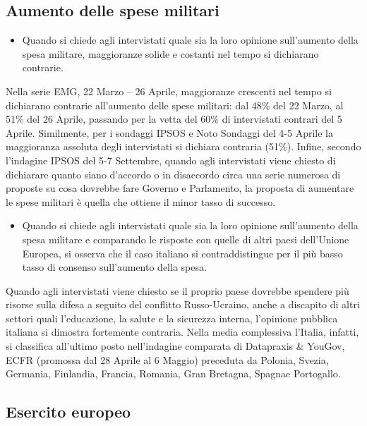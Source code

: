 \documentclass[
]{book}
\providecommand{\tightlist}{%
  \setlength{\itemsep}{0pt}\setlength{\parskip}{0pt}}
\begin{document}
\hypertarget{aumento-delle-spese-militari}{%
\subsection{Aumento delle spese militari}\label{aumento-delle-spese-militari}}

\begin{itemize}
\tightlist
\item
  Quando si chiede agli intervistati quale sia la loro opinione sull'aumento della spesa militare, maggioranze solide e costanti nel tempo si dichiarano contrarie.
\end{itemize}

Nella serie EMG, 22 Marzo -- 26 Aprile, maggioranze crescenti nel tempo si dichiarano contrarie all'aumento delle spese militari: dal 48\% del 22 Marzo, al 51\% del 26 Aprile, passando per la vetta del 60\% di intervistati contrari del 5 Aprile. Similmente, per i sondaggi IPSOS e Noto Sondaggi del 4-5 Aprile la maggioranza assoluta degli intervistati si dichiara contraria (51\%).
Infine, secondo l'indagine IPSOS del 5-7 Settembre, quando agli intervistati viene chiesto di dichiarare quanto siano d'accordo o in disaccordo circa una serie numerosa di proposte su cosa dovrebbe fare Governo e Parlamento, la proposta di aumentare le spese militari è quella che ottiene il minor tasso di successo.

\begin{itemize}
\tightlist
\item
  Quando si chiede agli intervistati quale sia la loro opinione sull'aumento della spesa militare e comparando le risposte con quelle di altri paesi dell'Unione Europea, si osserva che il caso italiano si contraddistingue per il più basso tasso di consenso sull'aumento della spesa.
\end{itemize}

Quando agli intervistati viene chiesto se il proprio paese dovrebbe spendere più risorse sulla difesa a seguito del conflitto Russo-Ucraino, anche a discapito di altri settori quali l'educazione, la salute e la sicurezza interna, l'opinione pubblica italiana si dimostra fortemente contraria. Nella media complessiva l'Italia, infatti, si classifica all'ultimo posto nell'indagine comparata di Datapraxis \& YouGov, ECFR (promossa dal 28 Aprile al 6 Maggio) preceduta da Polonia, Svezia, Germania, Finlandia, Francia, Romania, Gran Bretagna, Spagnae Portogallo.

\hypertarget{esercito-europeo}{%
\subsection{Esercito europeo}\label{esercito-europeo}}
\end{document}
